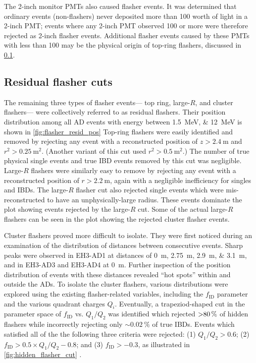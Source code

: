 The 2-inch monitor PMTs also caused flasher events.
It was determined that ordinary events (non-flashers)
never deposited more than \SI{100}{\pe} worth of light
in a 2-inch PMT;
events where any 2-inch PMT observed \SI{100}{\pe} or more
were therefore rejected as 2-inch flasher events.
Additional flasher events caused by these PMTs with less than \SI{100}{\pe}
may be the physical origin of top-ring flashers,
discussed in \cref{subsec:flash_resid}.

\subsection{Residual flasher cuts}
\label{subsec:flash_resid}

The remaining three types of flasher events---%
top ring, large-$R$, and cluster flashers---%
were collectively referred to as residual flashers.
Their position distribution among all AD events
with energy between \SIlist{1.5;12}{\MeV}
is shown in \cref{fig:flasher_resid_pos}
Top-ring flashers were easily identified and removed
by rejecting any event with a reconstructed position
of $z > \SI{2.4}{\m}$ and $r^2 > \SI{0.25}{\m\squared}$.
(Another variant of this cut used $r^2 > \SI{0.5}{\m\squared}$.)
The number of true physical single events and
true IBD events removed by this cut was negligible.
Large-$R$ flashers were similarly easy to remove
by rejecting any event with a reconstructed position
of $r > \SI{2.2}{\m}$,
again with a negligible inefficiency for singles and IBDs.
The large-$R$ flasher cut also rejected
single events which were mis-reconstructed to have an unphysically-large radius.
These events dominate the plot showing events rejected by the large-$R$ cut.
Some of the actual large-$R$ flashers can be seen in the plot
showing the rejected cluster flasher events.

Cluster flashers proved more difficult to isolate.
They were first noticed during an examination of the distribution of distances
between consecutive events.
Sharp peaks were observed in EH3-AD1 at distances of \SIlist{0;2.75;2.9;3.1}{\m},
and in EH3-AD3 and EH3-AD4 at \SI{0}{\m}.
Further inspection of the position distribution of events with these distances
revealed ``hot spots'' within and outside the ADs.
To isolate the cluster flashers,
various distributions were explored using the existing flasher-related variables,
including the $f_{\text{ID}}$ parameter and the various quadrant charges $Q_i$.
Eventually, a trapeziod-shaped cut in the parameter space of
$f_{\text{ID}}$ vs. $Q_1/Q_2$ was identified which rejected
$\SI{>80}{\percent}$ of hidden flashers while incorrectly rejecting only
$\sim\SI{0.02}{\percent}$ of true IBDs.
Events which satisfied all of the the following three criteria were rejected:
(1) $Q_1/Q_2 > 0.6$; (2) $f_{\text{ID}} > 0.5 \times Q_1/Q_2 - 0.8$;
and (3) $f_{\text{ID}} > -0.3$,
as illustrated in \cref{fig:hidden_flasher_cut}
\cite{flashers_jinjing,beda_resid_flasher_dt}.


